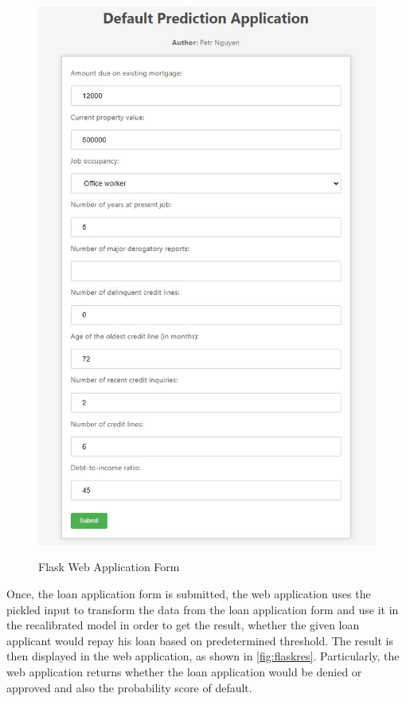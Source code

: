         \begin{figure}[H]
            \centering
            \caption{Flask Web Application Form}\vspace{0.5em}
            \label{fig:flaskform}\
            \includegraphics[width=140mm]{Figures/flask_app_form.jpg}
        
            \vspace{-1em}
        \end{figure}
        \clearpage
        
        Once, the loan application form is submitted, the web application uses the pickled input to transform the data from the loan application form and use it in the recalibrated model in order to get the result, whether the given loan applicant would repay his loan based on predetermined threshold. The result is then displayed in the web application, as shown in \autoref{fig:flaskres}.
        Particularly, the web application returns whether the loan application would be denied or approved and also the probability score of default.
        
